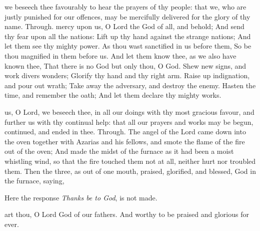 \collect
{} we beseech thee favourably to hear the prayers of thy people: that we, who are justly punished for our offences, may be mercifully delivered for the glory of thy name. Through.
 mercy upon us, O Lord the God of all, and behold; And send thy fear upon all the nations: Lift up thy hand against the strange nations; And let them see thy mighty power. As thou wast sanctified in us before them, So be thou magnified in them before us. And let them know thee, as we also have known thee, That there is no God but only thou, O God. Shew new signs, and work divers wonders; Glorify thy hand and thy right arm. Raise up indignation, and pour out wrath; Take away the adversary, and destroy the enemy. Hasten the time, and remember the oath; And let them declare thy mighty works.

\collect
{} us, O Lord, we beseech thee, in all our doings with thy most gracious favour, and further us with thy continual help: that all our prayers and works may be begun, continued, and ended in thee. Through.
 The angel of the Lord came down into the oven together with Azarias and his fellows, and smote the flame of the fire out of the oven; And made the midst of the furnace as it had been a moist whistling wind, so that the fire touched them not at all, neither hurt nor troubled them. Then the three, as out of one mouth, praised, glorified, and blessed, God in the furnace, saying,
\begin{rubric}
    Here the response \emph{Thanks be to God}, is not made.
\end{rubric}
 art thou, O Lord God of our fathers. And worthy to be praised and glorious for ever.\par
{}

